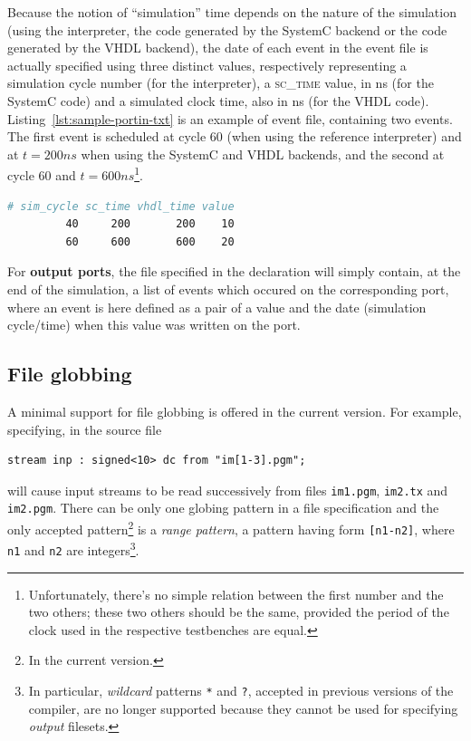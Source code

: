 Because the notion of ``simulation'' time depends on the nature of the simulation (using the
interpreter, the code generated by the SystemC backend or the code generated by the VHDL backend),
the date of each event in the event file is actually specified using three distinct values,
respectively representing a simulation cycle number (for the interpreter), a \textsc{sc_time} value,
in ns (for the SystemC code) and a simulated clock time, also in ns (for the VHDL code).
Listing~\ref{lst:sample-portin-txt} is an example of event file, containing two events. The first
event is scheduled at cycle 60 (when using the reference interpreter) and at $t=200 ns$ when using
the SystemC and VHDL backends, and the second at cycle 60 and $t=600 ns$\footnote{Unfortunately,
  there's no simple relation between the first number and the two others; these two others should be
  the same, provided the period of the clock used in the respective testbenches are equal.}. 

\begin{lstlisting}[language=make,basicstyle=\footnotesize,frame=single,caption={A sample event file,
    to be attached to a input port declaration},label={lst:sample-portin-txt}]
# sim_cycle sc_time vhdl_time value
         40     200       200    10
         60     600       600    20
\end{lstlisting}

\medskip
For \textbf{output ports}, the file specified in the declaration will simply contain, at the end of the
simulation, a list of events which occured on the corresponding port, where an event is here defined
as a pair of a value and the date (simulation cycle/time) when this value was written on the port.  

\subsection{File globbing}
\label{sec:file-globbing}

A minimal support for file globbing is offered in the current version. For example, specifying,
in the \caph source file 

\begin{lstlisting}
stream inp : signed<10> dc from "im[1-3].pgm";
\end{lstlisting}

will cause input streams to be read successively from files \verb|im1.pgm|, \verb|im2.tx| and
\verb|im2.pgm|. There can be only one globing pattern in a file specification and the only
accepted pattern\footnote{In the current version.} is a \emph{range pattern}, \ie a pattern having
form \verb|[n1-n2]|, where \texttt{n1} and \texttt{n2} are integers\footnote{In particular,
  \emph{wildcard} patterns \texttt{*} and \texttt{?}, accepted in previous versions of the compiler,
  are no longer supported because they cannot be used for specifying \emph{output} filesets.}.

